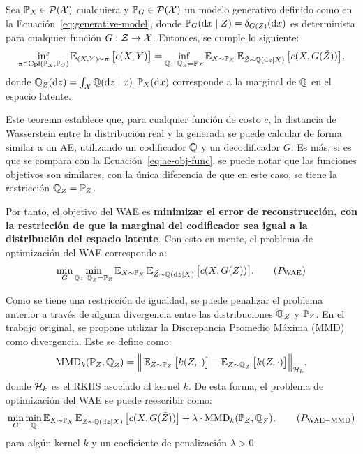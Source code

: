 \begin{theorem}
    Sea $\Prob_X\in \ProbSpace$ cualquiera y  $\Prob_G\in \ProbSpace$ un modelo generativo definido como en la Ecuación~\eqref{eq:generative-model}, donde $\Prob_G(\dd x \mid Z) = \delta_{G(Z)}(\dd x)$ es determinista para cualquier función $G:\mathcal{Z} \to \mathcal{X}$. Entonces, se cumple lo siguiente:
    \begin{equation}
        \inf_{\pi\in\Cpl(\Prob_X, \Prob_G)} \Exp_{(X, Y)\sim\pi} \qty\big[ c(X, Y) ] = \inf_{\ProbQ \colon \ProbQ_Z = \Prob_Z} \Exp_{X\sim\Prob_X} \Exp_{\tilde Z\sim\ProbQ(\dd z \mid X)} \qty\big[ c(X, G(\tilde Z)) ],
    \end{equation}
    donde
    $\ProbQ_Z(\dd z) = \int_{\cX} \ProbQ(\dd z \mid x)\; \Prob_X(\dd x)$
    corresponde a la marginal de $\ProbQ$ en el espacio latente.
\end{theorem}

Este teorema establece que, para cualquier función de costo $c$, la distancia de Wasserstein entre la distribución real y la generada se puede calcular de forma similar a un AE, utilizando un codificador $\ProbQ$ y un decodificador $G$. Es más, si es que se compara con la Ecuación~\eqref{eq:ae-obj-func}, se puede notar que las funciones objetivos son similares, con la única diferencia de que en este caso, se tiene la restricción $\ProbQ_Z = \Prob_Z$.

Por tanto, el objetivo del WAE es \textbf{minimizar el error de reconstrucción, con la restricción de que la marginal del codificador sea igual a la distribución del espacio latente}. Con esto en mente, el problema de optimización del WAE corresponde a:
\begin{equation}
    \min_{G} \min_{\ProbQ\colon \ProbQ_Z = \Prob_Z} \Exp_{X\sim\Prob_X} \Exp_{\tilde Z\sim\ProbQ(\dd z \mid X)} \qty\big[ c(X, G(\tilde Z)) ].\tag{$P_{\mathrm{WAE}}$}
\end{equation}

Como se tiene una restricción de igualdad, se puede penalizar el problema anterior a través de alguna divergencia entre las distribuciones $\ProbQ_Z$ y $\Prob_Z$. En el trabajo original, se propone utilizar la Discrepancia Promedio Máxima (MMD) \cite{gretton2006kernel} como divergencia. Este se define como:
\begin{equation}
    \MMDOp_k(\Prob_Z, \ProbQ_Z) = \Big\|
    \Exp_{Z\sim\Prob_Z} \qty\big[ k(Z, \cdot) ] - \Exp_{Z\sim\ProbQ_Z} \qty\big[ k(Z, \cdot) ]
    \Big\|_{\cH_k},
\end{equation}
donde $\mathcal{H}_k$ es el RKHS asociado al kernel $k$. De esta forma, el problema de optimización del WAE se puede reescribir como:
\begin{equation}
    \min_{G} \min_{\ProbQ} \Exp_{X\sim\Prob_X} \Exp_{\tilde Z\sim\ProbQ(\dd z \mid X)} \qty\big[ c(X, G(\tilde Z)) ] + \lambda \cdot \MMDOp_{k}(\Prob_Z, \ProbQ_Z),\tag{$P_{\mathrm{WAE-MMD}}$}
\end{equation}
para algún kernel $k$ y un coeficiente de penalización $\lambda > 0$.

